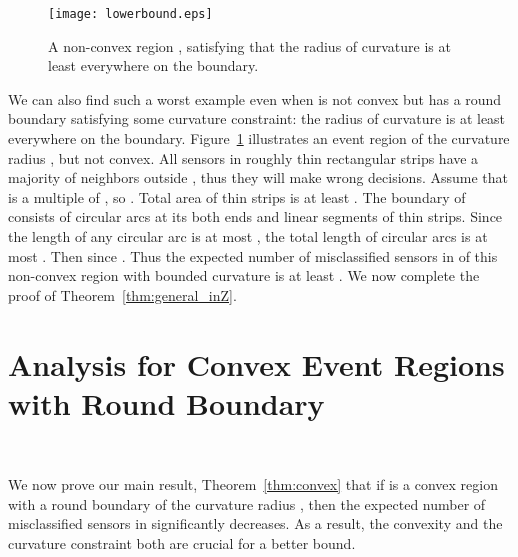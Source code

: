 \documentclass{article}
\begin{document}
\begin{figure}
\centering
    \texttt{[image: lowerbound.eps]}
\caption{A non-convex region , satisfying that the radius of curvature is at least  everywhere on the boundary.}
\label{fig:lowerbound}
\end{figure}

\par
We can also find such a worst example even when  is not convex but has a round boundary satisfying some curvature constraint: the radius of curvature is at least  everywhere on the boundary. Figure~\ref{fig:lowerbound} illustrates an event region  of the curvature radius , but not convex. All sensors in roughly  thin rectangular strips have a majority of neighbors outside , thus they will make wrong decisions. Assume that  is a multiple of , so . Total area of thin strips is at least . The boundary of  consists of circular arcs at its both ends and linear segments of thin strips. Since the length of any circular arc is at most , the total length of circular arcs is at most . Then  since . Thus the expected number of misclassified sensors in  of this non-convex region  with bounded curvature  is at least . We now complete the proof of Theorem~\ref{thm:general_inZ}.



\section{Analysis for Convex Event Regions with Round Boundary}~\label{sec:convex}

We now prove our main result, Theorem~\ref{thm:convex} that if  is a convex region with a round boundary of the curvature radius , then the expected number of misclassified sensors in  significantly decreases. As a result, the convexity and the curvature constraint both are crucial for a better bound.
\end{document}
